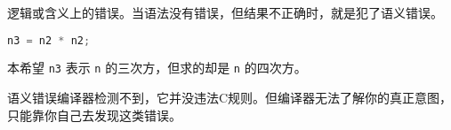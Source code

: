\begin{frame}[fragile]
\begin{dingyi}[语义错误]
逻辑或含义上的错误。当语法没有错误，但结果不正确时，就是犯了语义错误。
\end{dingyi}\pause  \vspace{.1in}


\begin{lstlisting}[language=c,frame=tb]
n3 = n2 * n2;
\end{lstlisting}
本希望 \lstinline|n3| 表示 \lstinline|n| 的三次方，但求的却是 \lstinline|n| 的四次方。\pause \vspace{0.1in}


语义错误编译器检测不到，它并没违法C规则。但编译器无法了解你的真正意图，只能靠你自己去发现这类错误。

\vspace{.1in}\pause 

\end{frame}

